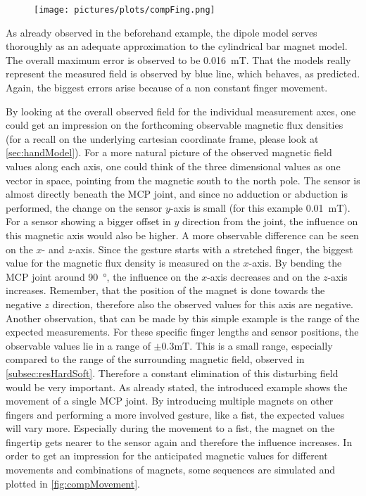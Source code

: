 \begin{figure}[h]
\centering
\texttt{[image: pictures/plots/compFing.png]}
\caption{}
\label{fig:modCompHand}
\end{figure}

As already observed in the beforehand example, the dipole model serves thoroughly as an adequate approximation to the cylindrical bar magnet model. The overall maximum error is observed to be \SI{0.016}{\milli \tesla}. That the models really represent the measured field is observed by blue line, which behaves, as predicted. Again, the biggest errors arise because of a non constant finger movement. 

By looking at the overall observed field for the individual measurement axes, one could get an impression on the forthcoming observable magnetic flux densities (for a recall on the underlying cartesian coordinate frame, please look at \ref{sec:handModel}). For a more natural picture of the observed magnetic field values along each axis, one could think of the three dimensional values as one vector in space, pointing from the magnetic south to the north pole. The sensor is almost directly beneath the \ac{MCP} joint, and since no adduction or abduction is performed, the change on the sensor $ y $-axis is small (for this example \SI{0.01}{\milli \tesla}). For a sensor showing a bigger offset in $ y $ direction from the joint, the influence on this magnetic axis would also be higher. A more observable difference can be seen on the $ x $- and $ z $-axis. Since the gesture starts with a stretched finger, the biggest value for the magnetic flux density is measured on the $ x $-axis. By bending the \ac{MCP} joint around \SI{90}{\degree}, the influence on the $ x $-axis decreases and on the $ z $-axis increases. Remember, that the position of the magnet is done towards the negative $ z $ direction, therefore also the observed values for this axis are negative. Another observation, that can be made by this simple example is the range of the expected measurements. For these specific finger lengths and sensor positions, the observable values lie in a range of $ \pm 0.3\si{\milli \tesla} $. This is a small range, especially compared to the range of the surrounding magnetic field, observed in \ref{subsec:resHardSoft}. Therefore a constant elimination of this disturbing field would be very important. As already stated, the introduced example shows the movement of a single \ac{MCP} joint. By introducing multiple magnets on other fingers and performing a more involved gesture, like a fist, the expected values will vary more. Especially during the movement to a fist, the magnet on the fingertip gets nearer to the sensor again and therefore the influence increases. In order to get an impression for the anticipated magnetic values for different movements and combinations of magnets, some sequences are simulated and plotted in \ref{fig:compMovement}.


